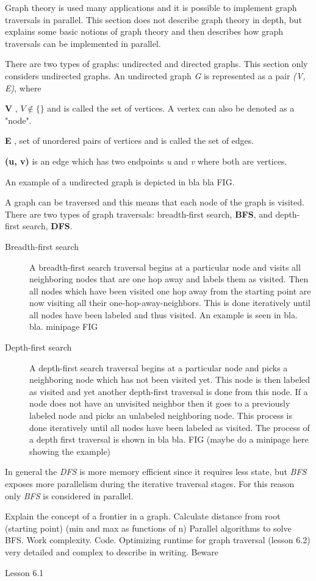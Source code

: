 Graph theory is used many applications and it is possible to implement graph traversals in parallel.
This section does not describe graph theory in depth, but explains some basic notions of graph theory and then describes how graph traversals can be implemented in parallel.

There are two types of graphs: undirected and directed graphs.
This section only considers undirected graphs.
An undirected graph \textit{G} is represented as a pair \textit{(V, E)}, where 
\begin{itemizeSmall}
	\item[\textbf{V}], $V\notin \{\}$ and is called the set of vertices. A vertex can also be denoted as a "node".
	\item[\textbf{E}], set of unordered pairs of vertices and is called the set of edges.
	\item[\textbf{(u, v)}] is an edge which has two endpoints \textit{u} and \textit{v} where both are vertices.
\end{itemizeSmall}
An example of a undirected graph is depicted in bla bla FIG.

A graph can be traversed and this means that each node of the graph is visited.
There are two types of graph traversals: breadth-first search, \textbf{BFS}, and depth-first search, \textbf{DFS}.
\begin{description}
	\item[Breadth-first search] A breadth-first search traversal begins at a particular node and visits all neighboring nodes that are one hop away and labels them as visited. Then all nodes which have been visited one hop away from the starting point are now visiting all their one-hop-away-neighbors. This is done iteratively until all nodes have been labeled and thus visited. An example is seen in bla. bla. minipage FIG
	\item[Depth-first search] A depth-first search traversal begins at a particular node and picks a neighboring node which has not been visited yet. This node is then labeled as visited and yet another depth-first traversal is done from this node. If a node does not have an unvisited neighbor then it goes to a previously labeled node and picks an unlabeled neighboring node. This process is done iteratively until all nodes have been labeled as visited. The process of a depth first traversal is shown in bla bla. FIG (maybe do a minipage here showing the example)
\end{description}
In general the \textit{DFS} is more memory efficient since it requires less state, but \textit{BFS} exposes more parallelism during the iterative traversal stages.
For this reason only \textit{BFS} is considered in parallel.

Explain the concept of a frontier in a graph.
Calculate distance from root (starting point) (min and max as functions of n)
Parallel algorithms to solve BFS.
Work complexity.
Code.
Optimizing runtime for graph traversal (lesson 6.2) very detailed and complex to describe in writing. Beware

Lesson 6.1